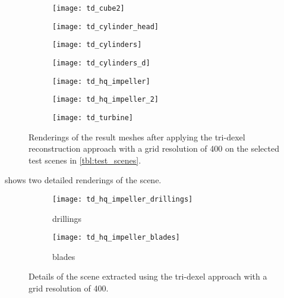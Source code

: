 \begin{figure}
	\centering
	\begin{subfigure}[b]{0.34\textwidth}
		\centering
		\texttt{[image: td\_cube2]}
		\caption{\cubes}
		\label{fig:td_cube2}
	\end{subfigure}
	\hspace{1cm}
	\begin{subfigure}[b]{0.34\textwidth}
		\centering
		\texttt{[image: td\_cylinder\_head]}
		\caption{\cylinderhead}
		\label{fig:td_cylinder_head}
	\end{subfigure}
	\begin{subfigure}[b]{0.34\textwidth}
		\centering
		\texttt{[image: td\_cylinders]}
		\caption{\cylinders}
		\label{fig:td_cylinders}
	\end{subfigure}
	\hspace{1cm}
	\begin{subfigure}[b]{0.34\textwidth}
		\centering
		\texttt{[image: td\_cylinders\_d]}
		\caption{\cylindersd}
		\label{fig:td_cylinders_delaunay}
	\end{subfigure}
	\begin{subfigure}[b]{0.34\textwidth}
		\centering
		\texttt{[image: td\_hq\_impeller]}
		\caption{\impeller}
		\label{fig:td_hq_impeller}
	\end{subfigure}
	\hspace{1cm}
	\begin{subfigure}[b]{0.34\textwidth}
		\centering
		\texttt{[image: td\_hq\_impeller\_2]}
		\caption{\impellerhalf}
		\label{fig:td_hq_impeller_2}
	\end{subfigure}
	\begin{subfigure}[b]{0.33\textwidth}
		\centering
		\texttt{[image: td\_turbine]}
		\caption{\turbine}
		\label{fig:td_turbine}
	\end{subfigure}
	\caption[Tri-dexel result renderings]{
		Renderings of the result meshes after applying the tri-dexel reconstruction approach with a grid resolution of 400 on the selected test scenes in \cref{tbl:test_scenes}.
	}
	\label{fig:td_results}
\end{figure}

 shows two detailed renderings of the \impeller scene.

\begin{figure}
	\centering
	\begin{subfigure}[b]{0.49\textwidth}
		\centering
		\texttt{[image: td\_hq\_impeller\_drillings]}
		\caption{\impeller drillings}
		\label{fig:td_hq_impeller_drillings}
	\end{subfigure}
	\begin{subfigure}[b]{0.49\textwidth}
		\centering
		\texttt{[image: td\_hq\_impeller\_blades]}
		\caption{\impeller blades}
		\label{fig:td_hq_impeller_blades}
	\end{subfigure}
	\caption[Tri-dexel result details]{
		Details of the \impeller scene extracted using the tri-dexel approach with a grid resolution of 400.
	}
	\label{fig:td_hq_impeller_details}
\end{figure}

